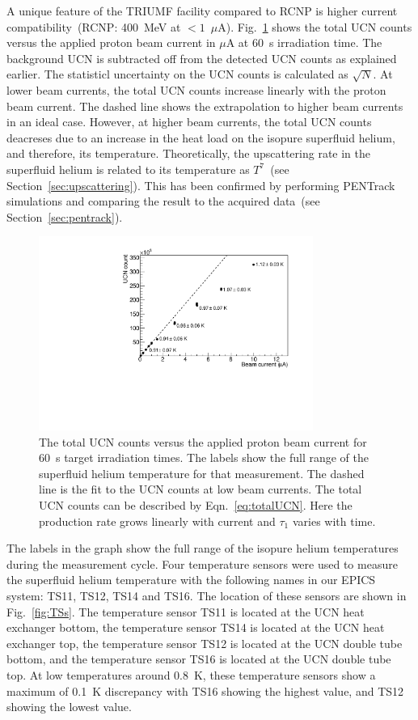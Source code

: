 A unique feature of the TRIUMF facility compared to RCNP is higher
current compatibility~(RCNP: 400~MeV at $<1$~$\mu$A).
Fig.~\ref{fig:counts_vs_beam} shows the total UCN counts versus the
applied proton beam current in $\mu$A at 60~s irradiation time. The
background UCN is subtracted off from the detected UCN counts as
explained earlier. The statisticl uncertainty on the UCN counts is
calculated as $\sqrt{N}$. At lower beam currents, the total UCN counts
increase linearly with the proton beam current. The dashed line shows
the extrapolation to higher beam currents in an ideal case. However,
at higher beam currents, the total UCN counts deacreses due to an
increase in the heat load on the isopure superfluid helium, and
therefore, its temperature. Theoretically, the upscattering rate in
the superfluid helium is related to its temperature as $T^7$~(see
Section~\ref{sec:upscattering}). This has been confirmed by performing
PENTrack simulations and comparing the result to the acquired
data~(see Section~\ref{sec:pentrack}).



\begin{figure}[h!]
  \centering
  \includegraphics[width=0.8\textwidth]{UCNCounts_vs_Beam.pdf}
  \caption[UCN counts versus proton beam current]{The total UCN counts
    versus the applied proton beam current for 60~s target irradiation
    times. The labels show the full range of the superfluid helium
    temperature for that measurement. The dashed line is the fit to
    the UCN counts at low beam currents. The total UCN counts can be
    described by Eqn.~\ref{eq:totalUCN}. Here the production rate
    grows linearly with current and $\tau_1$ varies with time.}
  \label{fig:counts_vs_beam}
\end{figure}


The labels in the graph show the full range of the isopure helium
temperatures during the measurement cycle. Four temperature sensors
were used to measure the superfluid helium temperature with the
following names in our EPICS system: TS11, TS12, TS14 and TS16. The
location of these sensors are shown in Fig.~\ref{fig:TSs}. The
temperature sensor TS11 is located at the UCN heat exchanger bottom,
the temperature sensor TS14 is located at the UCN heat exchanger top,
the temperature sensor TS12 is located at the UCN double tube bottom,
and the temperature sensor TS16 is located at the UCN double tube
top. At low temperatures around 0.8~K, these temperature sensors show
a maximum of 0.1~K discrepancy with TS16 showing the highest value,
and TS12 showing the lowest value.


